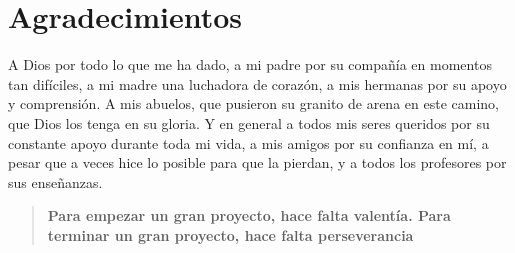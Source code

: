 \documentclass[12pt,oneside,a4paper]{book}
\begin{document}
\chapter*{Agradecimientos}
A Dios por todo lo que me ha dado, a mi padre por su compañía en momentos tan difíciles, a mi madre una luchadora de corazón, a mis hermanas por su apoyo y comprensión. A mis abuelos, que pusieron su granito de arena en este camino, que Dios los tenga en su gloria. Y en general a todos mis seres queridos por su constante apoyo durante toda mi vida, a mis amigos por su confianza en mí, a pesar que a veces hice lo posible para que la pierdan, y a todos los profesores por sus enseñanzas.
  \begin{quotation}
\textbf{Para empezar un gran proyecto, hace falta valentía. Para terminar un gran proyecto, hace falta perseverancia} 
\end{quotation}



\end{document}
